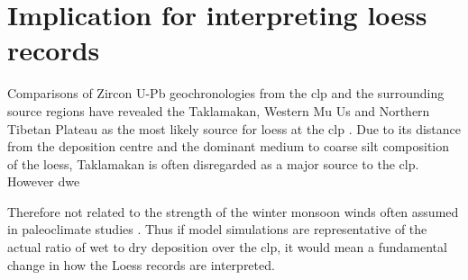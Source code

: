
\section{Implication for interpreting loess records}

Comparisons of Zircon U-Pb geochronologies from the \acrshort{clp} and the surrounding source regions have revealed the Taklamakan, Western Mu Us and Northern Tibetan Plateau as the most likely source for loess at the \acrshort{clp} \parencite{bird2015quaternary}. Due to its distance from the deposition centre and the dominant medium to coarse silt composition of the loess, Taklamakan is often disregarded as a major source to the \acrshort{clp}. However    
dwe

Therefore not related to the strength of the winter monsoon winds often assumed in paleoclimate studies \parencite{chen2006zr}. 
Thus if model simulations are representative of the actual ratio of wet to dry deposition over the \acrshort{clp}, it would mean a fundamental change in how the Loess records are interpreted.